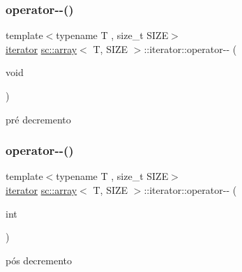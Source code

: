 \subsubsection{\texorpdfstring{operator-\/-\/()}{operator--()}\hspace{0.1cm}{\footnotesize\ttfamily [1/2]}}
{\footnotesize\ttfamily template$<$typename T , size\+\_\+t S\+I\+ZE$>$ \\
\hyperlink{classsc_1_1array_1_1iterator}{iterator} \hyperlink{classsc_1_1array}{sc\+::array}$<$ T, S\+I\+ZE $>$\+::iterator\+::operator-\/-\/ (\begin{DoxyParamCaption}\item[{void}]{ }\end{DoxyParamCaption})\hspace{0.3cm}{\ttfamily [inline]}}



pré decremento 

\mbox{\label{classsc_1_1array_1_1iterator_aaa661b8d468c66579c923ced7e3dded1}} 
\subsubsection{\texorpdfstring{operator-\/-\/()}{operator--()}\hspace{0.1cm}{\footnotesize\ttfamily [2/2]}}
{\footnotesize\ttfamily template$<$typename T , size\+\_\+t S\+I\+ZE$>$ \\
\hyperlink{classsc_1_1array_1_1iterator}{iterator} \hyperlink{classsc_1_1array}{sc\+::array}$<$ T, S\+I\+ZE $>$\+::iterator\+::operator-\/-\/ (\begin{DoxyParamCaption}\item[{int}]{ }\end{DoxyParamCaption})\hspace{0.3cm}{\ttfamily [inline]}}



pós decremento 

\mbox{\label{classsc_1_1array_1_1iterator_a764f122ad659642c353cf09df46fa88e}} 
